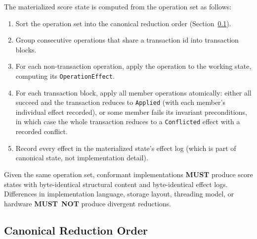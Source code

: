 \documentclass[11pt,letterpaper]{report}
\newcounter{requirement}[chapter]
\newcommand{\MUST}{\textbf{MUST}}
\newcommand{\MUSTNOT}{\textbf{MUST}\nobreak\ \textbf{NOT}}
\begin{document}
\begin{requirement}
  \label{req:semops:reduction-algorithm}
  The materialized score state is computed from the operation set as
  follows:

  \begin{enumerate}
    \item Sort the operation set into the canonical reduction order
      (Section~\ref{sec:semops:reduction-order}).
    \item Group consecutive operations that share a transaction id
      into transaction blocks.
    \item For each non-transaction operation, apply the operation to
      the working state, computing its \texttt{OperationEffect}.
    \item For each transaction block, apply all member operations
      atomically: either all succeed and the transaction reduces to
      \texttt{Applied} (with each member's individual effect
      recorded), or some member fails its invariant preconditions,
      in which case the whole transaction reduces to a
      \texttt{Conflicted} effect with a recorded conflict.
    \item Record every effect in the materialized state's effect log
      (which is part of canonical state, not implementation detail).
  \end{enumerate}

  Given the same operation set, conformant implementations \MUST{}
  produce score states with byte-identical structural content and
  byte-identical effect logs. Differences in implementation language,
  storage layout, threading model, or hardware \MUSTNOT{} produce
  divergent reductions.
\end{requirement}

\subsection{Canonical Reduction Order}
\label{sec:semops:reduction-order}
\end{document}
